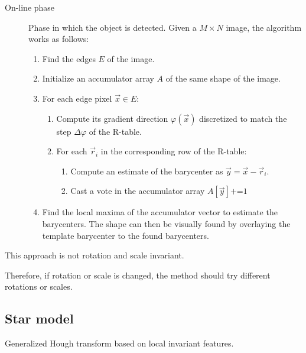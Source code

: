 \begin{description}
    \item[On-line phase]
        Phase in which the object is detected.
        Given a $M \times N$ image, the algorithm works as follows:
        \begin{enumerate}
            \item Find the edges $E$ of the image.
            \item Initialize an accumulator array $A$ of the same shape of the image.
            \item For each edge pixel $\vec{x} \in E$:
                \begin{enumerate}
                    \item Compute its gradient direction $\varphi(\vec{x})$ discretized to match the step $\Delta \varphi$ of the R-table.
                    \item For each $\vec{r}_i$ in the corresponding row of the R-table:
                    \begin{enumerate}
                        \item Compute an estimate of the barycenter as $\vec{y} = \vec{x} - \vec{r}_i$.
                        \item Cast a vote in the accumulator array $A[\vec{y}] \texttt{+=} 1$
                    \end{enumerate}
                \end{enumerate}
            \item Find the local maxima of the accumulator vector to estimate the barycenters.
                The shape can then be visually found by overlaying the template barycenter to the found barycenters.
        \end{enumerate}
\end{description}

\begin{remark}
    This approach is not rotation and scale invariant.

    Therefore, if rotation or scale is changed, the method should try different rotations or scales.
\end{remark}


\subsection{Star model}

Generalized Hough transform based on local invariant features.


